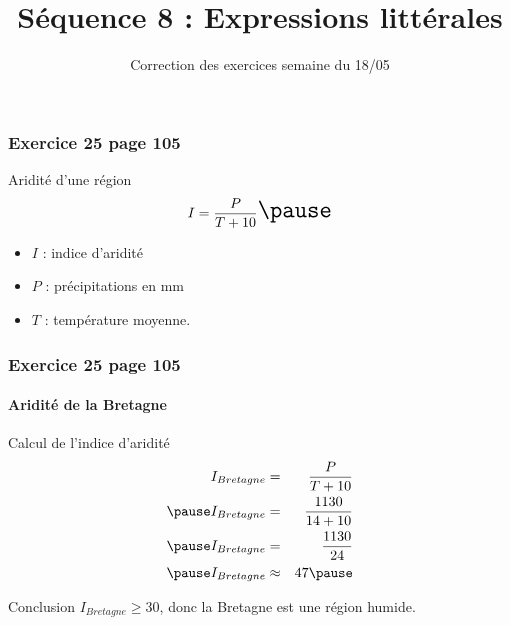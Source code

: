 \documentclass[xcolor={dvipsnames}]{beamer}
\title{Séquence 8 : Expressions littérales}
\subtitle{Correction des exercices semaine du 18/05}
\begin{document}


	

\begin{frame}
	\frametitle{Exercice 25 page 105}
	
	\begin{block}{Aridité d'une région}
		\begin{equation*}
			{\LARGE I = \dfrac{P}{T + 10}\pause}
		\end{equation*}
		
		\begin{itemize}
			\item $I$ : indice d'aridité \pause
			\item $P$ : précipitations en mm \pause
			\item $T$ : température moyenne.
		\end{itemize}
	\end{block}
	
	
\end{frame}


\begin{frame}
	\frametitle{Exercice 25 page 105}
	\framesubtitle{Aridité de la Bretagne}
	
	\begin{block}{Calcul de l'indice d'aridité}
		\begin{eqnarray*}
			I_{Bretagne} &=& \dfrac{P}{T + 10} \\ \pause
			I_{Bretagne} &=& \dfrac{\num{1130}}{14 + 10} \\ \pause
			I_{Bretagne} &=& \dfrac{\num{1130}}{24} \\ \pause
			I_{Bretagne} &\approx& \num{47} \pause			
		\end{eqnarray*}
		
		
	\end{block}
	
	\begin{alertblock}{Conclusion}
		$I_{Bretagne} \ge 30$, donc la Bretagne est une région humide.
	\end{alertblock}
\end{frame}
\end{document}
